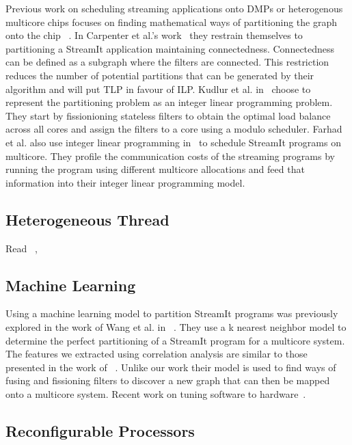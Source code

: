 Previous work on scheduling streaming applications onto DMPs or heterogenous multicore chips focuses on finding mathematical ways of partitioning the graph onto the chip ~\cite{carpenter2009streammap,kudlur2008orchestratingstreamprog}.  
In Carpenter et al.'s work~\cite{carpenter2009streammap} they restrain themselves to partitioning a StreamIt application maintaining connectedness.
Connectedness can be defined as a subgraph where the filters are connected. 
This restriction reduces the number of potential partitions that can be generated by their algorithm and will put TLP in favour of ILP. 
Kudlur et al. in~\cite{kudlur2008orchestratingstreamprog} choose to represent the partitioning problem as an integer linear programming problem.
They start by fissionioning stateless filters to obtain the optimal load balance across all cores and assign the filters to a core using a modulo scheduler.
Farhad et al. also use integer linear programming in~\cite{farhad2012streamilp} to schedule StreamIt programs on multicore.
They profile the communication costs of the streaming programs by running the program using different multicore allocations and feed that information into their integer linear programming model.

\subsection{Heterogeneous Thread}
Read ~\cite{becchi2006ThreadOnCore}, ~\cite{adileh2016power}

\subsection{Machine Learning} 
Using a machine learning model to partition StreamIt programs was previously explored in the work of Wang et al. in ~\cite{wang2013partitionstreamit}.
They use a k nearest neighbor model to determine the perfect partitioning of a StreamIt program for a multicore system. 
The features we extracted using correlation analysis are similar to those presented in the work of ~\cite{wang2013partitionstreamit}.
Unlike our work their model is used to find ways of fusing and fissioning filters to discover a new graph that can then be mapped onto a multicore system.
Recent work on tuning software to hardware~\cite{cummins2017pact}.


\subsection{Reconfigurable Processors}

